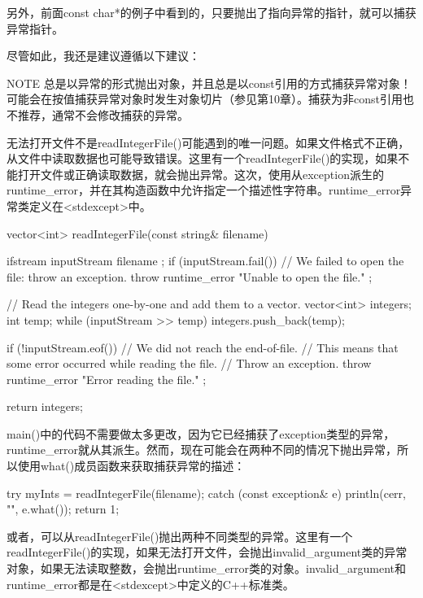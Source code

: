 另外，前面const char*的例子中看到的，只要抛出了指向异常的指针，就可以捕获异常指针。

尽管如此，我还是建议遵循以下建议：

\begin{myNotic}{NOTE}
总是以异常的形式抛出对象，并且总是以const引用的方式捕获异常对象！可能会在按值捕获异常对象时发生对象切片（参见第10章）。捕获为非const引用也不推荐，通常不会修改捕获的异常。
\end{myNotic}


无法打开文件不是readIntegerFile()可能遇到的唯一问题。如果文件格式不正确，从文件中读取数据也可能导致错误。这里有一个readIntegerFile()的实现，如果不能打开文件或正确读取数据，就会抛出异常。这次，使用从exception派生的runtime\_error，并在其构造函数中允许指定一个描述性字符串。runtime\_error异常类定义在<stdexcept>中。

\begin{cpp}
vector<int> readIntegerFile(const string& filename)
{
    ifstream inputStream { filename };
    if (inputStream.fail()) {
        // We failed to open the file: throw an exception.
        throw runtime_error { "Unable to open the file." };
    }

    // Read the integers one-by-one and add them to a vector.
    vector<int> integers;
    int temp;
    while (inputStream >> temp) {
        integers.push_back(temp);
    }

    if (!inputStream.eof()) {
        // We did not reach the end-of-file.
        // This means that some error occurred while reading the file.
        // Throw an exception.
        throw runtime_error { "Error reading the file." };
    }

    return integers;
}
\end{cpp}

main()中的代码不需要做太多更改，因为它已经捕获了exception类型的异常，runtime\_error就从其派生。然而，现在可能会在两种不同的情况下抛出异常，所以使用what()成员函数来获取捕获异常的描述：

\begin{cpp}
try {
    myInts = readIntegerFile(filename);
} catch (const exception& e) {
    println(cerr, "{}", e.what());
    return 1;
}
\end{cpp}

或者，可以从readIntegerFile()抛出两种不同类型的异常。这里有一个readIntegerFile()的实现，如果无法打开文件，会抛出invalid\_argument类的异常对象，如果无法读取整数，会抛出runtime\_error类的对象。invalid\_argument和runtime\_error都是在<stdexcept>中定义的C++标准类。


